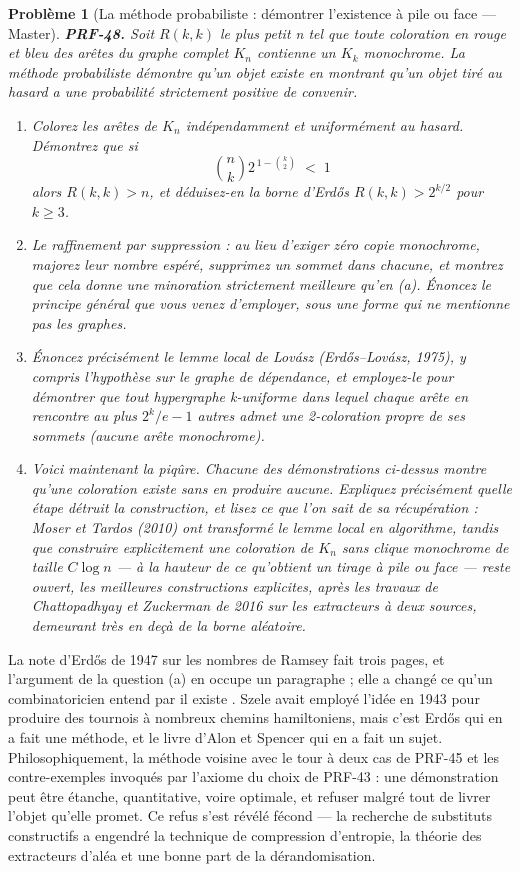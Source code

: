\documentclass[11pt]{article}
\newtheorem{problem}{Problème}
\begin{document}
\bigskip

\begin{problem}[{La méthode probabiliste : démontrer l'existence à pile ou face --- Master}]
\textbf{PRF-48.} Soit $ R(k,k) $ le plus petit n tel que toute coloration en rouge et
bleu des arêtes du graphe complet $ K_n $ contienne un $ K_k $ monochrome. La méthode
probabiliste démontre qu'un objet existe en montrant qu'un objet tiré au hasard a une
probabilité strictement positive de convenir.
\begin{enumerate}
\item[(a)] Colorez les arêtes de $ K_n $ indépendamment et uniformément au hasard. Démontrez que si
\[ \binom{n}{k} 2^{\,1 - \binom{k}{2}} \;<\; 1 \]
alors $ R(k,k) >n $, et déduisez-en la borne d'Erd\H{o}s $ R(k,k) >2^{k/2} $ pour
$ k \ge 3 $.
\item[(b)] Le raffinement par suppression : au lieu d'exiger zéro copie monochrome, majorez leur
\textit{nombre espéré}, supprimez un sommet dans chacune, et montrez que cela donne une
minoration strictement meilleure qu'en (a). Énoncez le principe général que vous venez
d'employer, sous une forme qui ne mentionne pas les graphes.
\item[(c)] Énoncez précisément le lemme local de Lovász (Erd\H{o}s--Lovász, 1975), y compris
l'hypothèse sur le graphe de dépendance, et employez-le pour démontrer que tout hypergraphe
k-uniforme dans lequel chaque arête en rencontre au plus $ 2^{k}/e - 1 $ autres admet une
2-coloration propre de ses sommets (aucune arête monochrome).
\item[(d)] Voici maintenant la piqûre. Chacune des démonstrations ci-dessus montre qu'une
coloration existe sans en produire aucune. Expliquez précisément quelle étape détruit la
construction, et lisez ce que l'on sait de sa récupération : Moser et Tardos (2010) ont
transformé le lemme local en algorithme, tandis que construire explicitement une coloration
de $ K_n $ sans clique monochrome de taille $ C\log n $ --- à la hauteur de ce qu'obtient
un tirage à pile ou face --- reste ouvert, les meilleures constructions explicites, après les
travaux de Chattopadhyay et Zuckerman de 2016 sur les extracteurs à deux sources, demeurant
très en deçà de la borne aléatoire.
\end{enumerate}

\end{problem}

\noindent La note d'Erd\H{o}s de 1947 sur les nombres de Ramsey fait trois pages, et
l'argument de la question (a) en occupe un paragraphe ; elle a changé ce qu'un
combinatoricien entend par \og{} il existe \fg{}. Szele avait employé l'idée en 1943 pour produire
des tournois à nombreux chemins hamiltoniens, mais c'est Erd\H{o}s qui en a fait une méthode, et
le livre d'Alon et Spencer qui en a fait un sujet. Philosophiquement, la méthode voisine avec
le tour à deux cas de PRF-45 et les contre-exemples invoqués par l'axiome du choix de
PRF-43 : une démonstration peut être étanche, quantitative, voire optimale, et refuser malgré
tout de livrer l'objet qu'elle promet. Ce refus s'est révélé fécond --- la recherche de
substituts constructifs a engendré la technique de compression d'entropie, la théorie des
extracteurs d'aléa et une bonne part de la dérandomisation.
\end{document}
